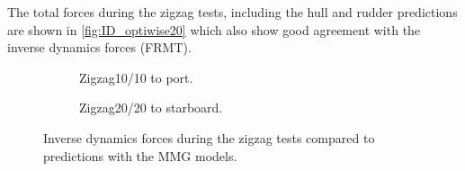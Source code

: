 The total forces during the zigzag tests, including the hull and rudder predictions are shown in \autoref{fig:ID_optiwise20} which also show good agreement with the inverse dynamics forces (FRMT).

\begin{figure}[h]
    \centering
    \begin{subfigure}[b]{\textwidth}
        \centering
        
        \caption{Zigzag10/10 to port.}
        \label{fig:ID_MMG_zigzag_10_10}
    \end{subfigure}
     \vfill
    \begin{subfigure}[b]{\textwidth}
        \centering
        
        \caption{Zigzag20/20 to starboard.}
        \label{fig:ID_MMG_zigzag_20_20}
    \end{subfigure}
    \caption{Inverse dynamics forces during the zigzag tests compared to predictions with the MMG models.}
    \label{fig:ID_optiwise20}
\end{figure}

